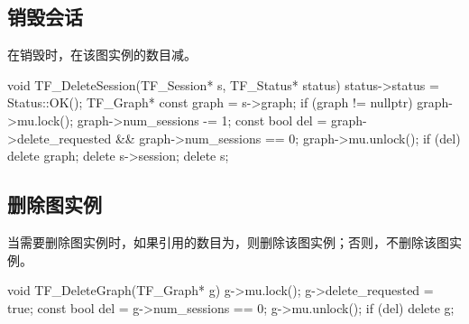 \begin{content}
\subsection{销毁会话}

在销毁时，在该图实例的数目减。

\begin{leftbar}
\begin{c++}
void TF_DeleteSession(TF_Session* s, TF_Status* status) {
  status->status = Status::OK();
  TF_Graph* const graph = s->graph;
  if (graph != nullptr) {
    graph->mu.lock();
    graph->num_sessions -= 1;
    const bool del = graph->delete_requested && graph->num_sessions == 0;
    graph->mu.unlock();
    if (del) delete graph;
  }
  delete s->session;
  delete s;
}
\end{c++}
\end{leftbar}

\subsection{删除图实例}

当需要删除图实例时，如果引用的数目为，则删除该图实例；否则，不删除该图实例。

\begin{leftbar}
\begin{c++}
void TF_DeleteGraph(TF_Graph* g) {
  g->mu.lock();
  g->delete_requested = true;
  const bool del = g->num_sessions == 0;
  g->mu.unlock();
  if (del) delete g;
}
\end{c++}
\end{leftbar}

\end{content}